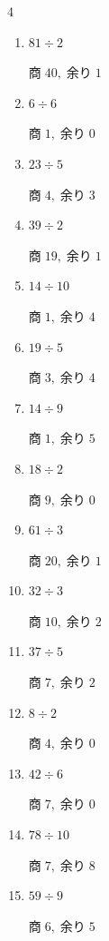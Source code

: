 \begin{multicols}{4}
\begin{enumerate}
\columnbreak %

  \item $81 \div 2$

        $商\; 40,\; 余り\; 1$

  \item $6 \div 6$

        $商\; 1,\; 余り\; 0$

  \item $23 \div 5$

        $商\; 4,\; 余り\; 3$

  \item $39 \div 2$

        $商\; 19,\; 余り\; 1$

  \item $14 \div 10$

        $商\; 1,\; 余り\; 4$

  \item $19 \div 5$

        $商\; 3,\; 余り\; 4$

  \item $14 \div 9$

        $商\; 1,\; 余り\; 5$

  \item $18 \div 2$

        $商\; 9,\; 余り\; 0$

  \item $61 \div 3$

        $商\; 20,\; 余り\; 1$

  \item $32 \div 3$

        $商\; 10,\; 余り\; 2$

  \item $37 \div 5$

        $商\; 7,\; 余り\; 2$

  \item $8 \div 2$

        $商\; 4,\; 余り\; 0$

  \item $42 \div 6$

        $商\; 7,\; 余り\; 0$

  \item $78 \div 10$

        $商\; 7,\; 余り\; 8$

  \item $59 \div 9$

        $商\; 6,\; 余り\; 5$


\end{enumerate}
\end{multicols}
